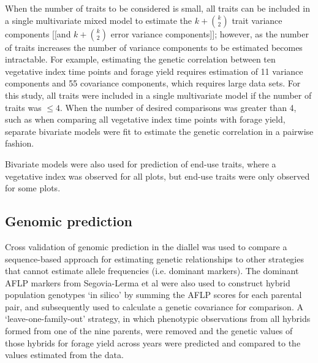 \documentclass[12pt, letterpaper]{article}
\begin{document}

When the number of traits to be considered is small, all traits can be included in a single multivariate mixed model to estimate the $k + \binom{k}{2}$ trait variance components [[and $k + \binom{k}{2}$ error variance components]]; however, as the number of traits increases the number of variance components to be estimated becomes intractable. For example, estimating the genetic correlation between ten vegetative index time points and forage yield requires estimation of 11 variance components and 55 covariance components, which requires large data sets. For this study, all traits were included in a single multivariate model if the number of traits was $\leq 4$. When the number of desired comparisons was greater than 4, such as when comparing all vegetative index time points with forage yield, separate bivariate models were fit to estimate the genetic correlation in a pairwise fashion. 

Bivariate models were also used for prediction of end-use traits, where a vegetative index was observed for all plots, but end-use traits were only observed for some plots.  


\subsection{Genomic prediction}

Cross validation of genomic prediction in the diallel was used to compare a sequence-based approach for estimating genetic relationships to other strategies that cannot estimate allele frequencies (i.e. dominant markers). The dominant AFLP markers from Segovia-Lerma et al \parencite*{segovia2003} were also used to construct hybrid population genotypes `in silico' by summing the AFLP scores for each parental pair, and subsequently used to calculate a genetic covariance for comparison. A `leave-one-family-out' strategy, in which phenotypic observations from all hybrids formed from one of the nine parents, were removed and the genetic values of those hybrids for forage yield across years were predicted and compared to the values estimated from the data.
\end{document}
